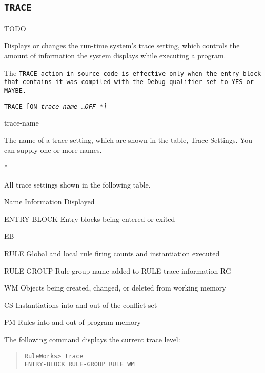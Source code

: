 {{\subsection{\tt{TRACE}}
TODO

Displays or changes the run-time system's trace setting, which
controls the amount of information the system displays while executing
a program.

\begin{note}
  The \tt{TRACE} action in source code is effective only when the entry
  block that contains it was compiled with the Debug qualifier set to
  \tt{YES} or \tt{MAYBE}.
\end{note}

\Format

\tt{TRACE} [\tt{ON} \it{trace-name} \ldots \tt{OFF} \tt{*}]

\begin{arguments}
\item[trace-name]

  The name of a trace setting, which are shown in the table, Trace
  Settings. You can supply one or more names.

\item[*]

  All trace settings shown in the following table.
\end{arguments}

Name  Information Displayed

{ENTRY-BLOCK}  Entry blocks being entered or exited

{EB}

RULE  Global and local rule firing counts and instantiation
executed

{RULE-GROUP} Rule group name added to RULE trace information
{RG}

WM  Objects being created, changed, or deleted from working
memory

CS  Instantiations into and out of the conflict set

PM  Rules into and out of program memory

\Example

The following command displays the current trace level:

\begin{quote}
\begin{verbatim}
RuleWorks> trace
ENTRY-BLOCK RULE-GROUP RULE WM
\end{verbatim}
 
\end{quote}

}}
